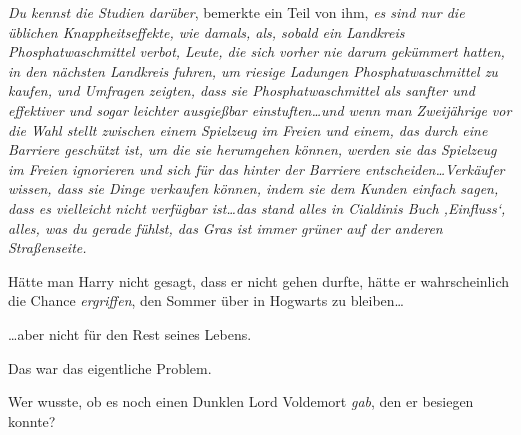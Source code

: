 \emph{Du kennst die \emph{Studien} darüber}, bemerkte ein Teil von ihm, \emph{es sind nur die üblichen Knappheitseffekte, wie damals, als, sobald ein Landkreis Phosphatwaschmittel verbot, Leute, die sich vorher nie darum gekümmert hatten, in den nächsten Landkreis fuhren, um riesige Ladungen Phosphatwaschmittel zu kaufen, und Umfragen zeigten, dass sie Phosphatwaschmittel als sanfter und effektiver und sogar leichter ausgießbar einstuften…und wenn man Zweijährige vor die Wahl stellt zwischen einem Spielzeug im Freien und einem, das durch eine Barriere geschützt ist, um die sie herumgehen können, werden sie das Spielzeug im Freien ignorieren und sich für das hinter der Barriere entscheiden…Verkäufer wissen, dass sie Dinge verkaufen können, indem sie dem Kunden einfach sagen, dass es vielleicht nicht verfügbar ist…das stand alles in Cialdinis Buch ‚Einfluss‘, alles, was du gerade fühlst, das Gras ist immer grüner auf der anderen Straßenseite.}

Hätte man Harry nicht gesagt, dass er nicht gehen durfte, hätte er wahrscheinlich die Chance \emph{ergriffen}, den Sommer über in Hogwarts zu bleiben…

…aber nicht für den Rest seines Lebens.

Das war das eigentliche Problem.

Wer wusste, ob es noch einen Dunklen Lord Voldemort \emph{gab}, den er besiegen konnte?

